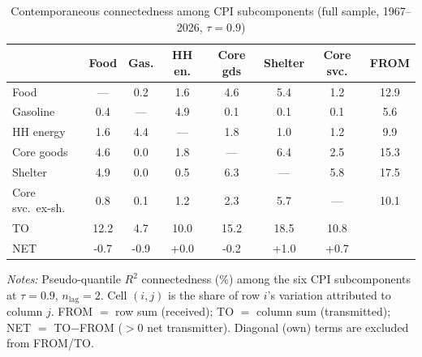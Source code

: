 \begin{table}[!ht]
\centering
\caption{Contemporaneous connectedness among CPI subcomponents (full sample, 1967--2026, $\tau=0.9$)}
\label{tab:conncfull}
\setlength{\tabcolsep}{4pt}\footnotesize
\begin{threeparttable}
\begin{tabular}{l c c c c c c c}
\toprule
 & Food & Gas. & HH en. & Core gds & Shelter & Core svc. & FROM \\
\midrule
Food & --- & 0.2 & 1.6 & 4.6 & 5.4 & 1.2 & 12.9 \\
Gasoline & 0.4 & --- & 4.9 & 0.1 & 0.1 & 0.1 & 5.6 \\
HH energy & 1.6 & 4.4 & --- & 1.8 & 1.0 & 1.2 & 9.9 \\
Core goods & 4.6 & 0.0 & 1.8 & --- & 6.4 & 2.5 & 15.3 \\
Shelter & 4.9 & 0.0 & 0.5 & 6.3 & --- & 5.8 & 17.5 \\
Core svc.\ ex-sh. & 0.8 & 0.1 & 1.2 & 2.3 & 5.7 & --- & 10.1 \\
\midrule
TO & 12.2 & 4.7 & 10.0 & 15.2 & 18.5 & 10.8 &  \\
NET & -0.7 & -0.9 & +0.0 & -0.2 & +1.0 & +0.7 &  \\
\bottomrule
\end{tabular}
\begin{tablenotes}[flushleft]\footnotesize
\item \textit{Notes:} Pseudo-quantile $R^2$ connectedness (\%) among the six CPI subcomponents at $\tau=0.9$, $n_{\text{lag}}=2$. Cell $(i,j)$ is the share of row $i$'s variation attributed to column $j$. FROM $=$ row sum (received); TO $=$ column sum (transmitted); NET $=$ TO$-$FROM ($>0$ net transmitter). Diagonal (own) terms are excluded from FROM/TO.
\end{tablenotes}
\end{threeparttable}
\end{table}

